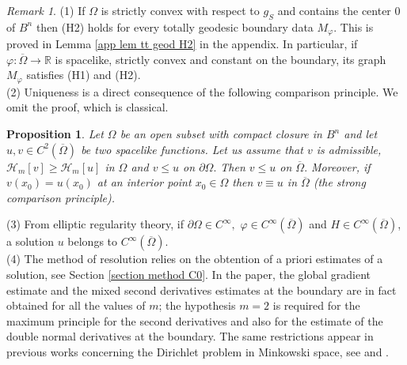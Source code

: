 \documentclass[10pt,reqno,oneside]{amsart}
\newtheorem{prop}[lem]{Proposition}
\theoremstyle{definition}
\theoremstyle{remark}
\newtheorem{rem}[lem]{Remark}
\newcommand{\R}{\mathbb{R}}
\begin{document}
\begin{rem}
(1) If $\Omega$ is strictly convex with respect to $g_S$ and contains the center $0$ of $B^n$ then (H2) holds for every totally geodesic boundary data $M_{\varphi}$. This is proved in Lemma \ref{app lem tt geod H2} in the appendix. In particular, if $\varphi:\overline{\Omega}\rightarrow\R$ is spacelike, strictly convex and constant on the boundary, its graph $M_{\varphi}$ satisfies (H1) and (H2).  
\\(2) Uniqueness is a direct consequence of the following comparison principle. We omit the proof, which is classical.
\begin{prop}
Let $\Omega$ be an open subset with compact closure in $B^n$ and let $u,v\in C^2(\overline{\Omega})$ be two spacelike functions. Let us assume that $v$ is admissible, $\mathcal{H}_m[v]\geq \mathcal{H}_m[u]$ in $\Omega$ and $v\leq u$ on $\partial\Omega.$ Then $v\leq u$ on $\overline{\Omega}.$ Moreover, if $v(x_0)=u(x_0)$ at an interior point $x_0\in\Omega$ then $v\equiv u$ in $\overline{\Omega}$ (the strong comparison principle).
\end{prop}
\noindent (3) From elliptic regularity theory, if $\partial\Omega\in C^{\infty},$ $\varphi\in C^{\infty}(\overline{\Omega})$ and $H\in C^{\infty}(\overline{\Omega})$, a solution $u$ belongs to $C^{\infty}(\overline{\Omega}).$
\\(4) The method of resolution relies on the obtention of a priori estimates of a solution, see Section \ref{section method C0}. In the paper, the global gradient estimate and the mixed second derivatives estimates at the boundary are in fact obtained for all the values of $m$; the hypothesis $m=2$ is required for the maximum principle for the second derivatives and also for the estimate of the double normal derivatives at the boundary. The same restrictions appear in previous works concerning the Dirichlet problem in Minkowski space, see \cite{Bay1} and \cite{Ur}.

\end{rem}
\end{document}
